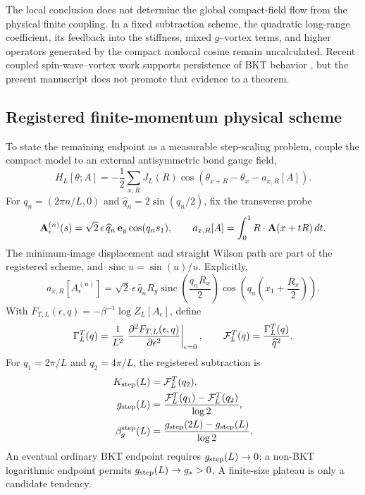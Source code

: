 \documentclass[aps,prb,preprint,notitlepage,groupedaddress,amsmath,amssymb,
               superscriptaddress,nofootinbib,floatfix]{revtex4-2}
\theoremstyle{definition}
\theoremstyle{plain}
\begin{document}
The local conclusion does not determine the global compact-field flow from
the physical finite coupling.  In a fixed subtraction scheme, the quadratic
long-range coefficient, its feedback into the stiffness, mixed
$g$--vortex terms, and higher operators generated by the compact nonlocal
cosine remain uncalculated.  Recent coupled spin-wave--vortex work supports
persistence of BKT behavior \cite{Walther2026}, but the present manuscript
does not promote that evidence to a theorem.

\subsection{Registered finite-momentum physical scheme}

To state the remaining endpoint as a measurable step-scaling problem,
couple the compact model to an external antisymmetric bond gauge field,
\begin{equation}
 H_L[\theta;A]
 =
 -\frac12\sum_{x,R}J_L(R)
 \cos\left(\theta_{x+R}-\theta_x-a_{x,R}[A]\right).
\end{equation}
For $q_n=(2\pi n/L,0)$ and
$\widehat q_n=2\sin(q_n/2)$, fix the transverse probe
\begin{equation}
 {\bf A}^{(n)}_\epsilon(s)
 =
 \sqrt2\,\epsilon\,\widehat q_n\,{\bf e}_y\cos(q_ns_1),
 \qquad
 a_{x,R}[A]
 =
 \int_0^1R\cdot{\bf A}(x+tR)\,dt .
\end{equation}
The minimum-image displacement and straight Wilson path are part of the
registered scheme, and $\operatorname{sinc}u=\sin(u)/u$.  Explicitly,
\begin{equation}
 a_{x,R}[A^{(n)}_\epsilon]
 =
 \sqrt2\,\epsilon\,\widehat q_nR_y
 \operatorname{sinc}\left(\frac{q_nR_x}{2}\right)
 \cos\left(q_n\left(x_1+\frac{R_x}{2}\right)\right).
\end{equation}
With $F_{T,L}(\epsilon,q)=-\beta^{-1}\log Z_L[A_\epsilon]$, define
\begin{equation}
 \Gamma^T_L(q)
 =
 \frac1{L^2}
 \left.
 \frac{\partial^2F_{T,L}(\epsilon,q)}{\partial\epsilon^2}
 \right|_{\epsilon=0},
 \qquad
 {\cal F}^T_L(q)=\frac{\Gamma^T_L(q)}{\widehat q^2}.
\end{equation}
For $q_1=2\pi/L$ and $q_2=4\pi/L$, the registered subtraction is
\begin{align}
 K_{\rm step}(L)&={\cal F}^T_L(q_2),\\
 g_{\rm step}(L)&=
 \frac{{\cal F}^T_L(q_1)-{\cal F}^T_L(q_2)}{\log2},\\
 \beta_g^{\rm step}(L)&=
 \frac{g_{\rm step}(2L)-g_{\rm step}(L)}{\log2}.
\end{align}
An eventual ordinary BKT endpoint requires $g_{\rm step}(L)\to0$;
a non-BKT logarithmic endpoint permits $g_{\rm step}(L)\to g_\ast>0$.
A finite-size plateau is only a candidate tendency.
\end{document}
